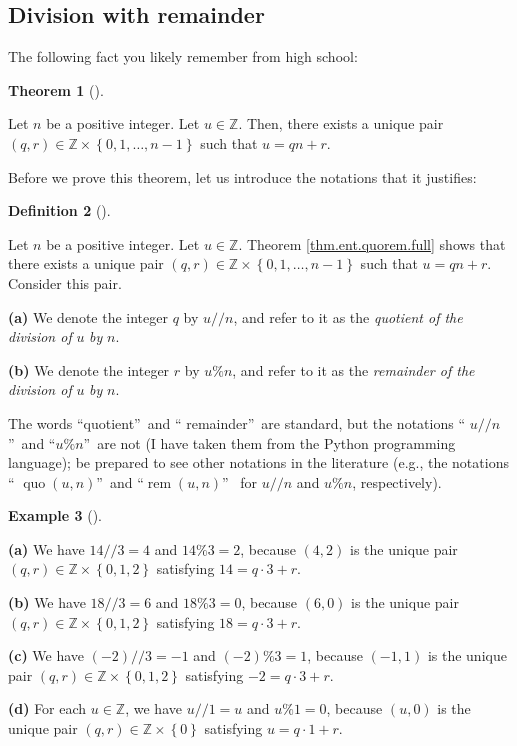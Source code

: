 \documentclass[numbers=enddot,12pt,final,onecolumn,notitlepage]{scrartcl}%
\numberwithin{exer}{subsection}
\theoremstyle{definition}
\newtheorem{theo}{Theorem}[subsection]
\newenvironment{theorem}[1][]
{\begin{theo}[#1]\begin{leftbar}}
{\end{leftbar}\end{theo}}
\newtheorem{defi}[theo]{Definition}
\newenvironment{definition}[1][]
{\begin{defi}[#1]\begin{leftbar}}
{\end{leftbar}\end{defi}}
\newtheorem{exam}[theo]{Example}
\newenvironment{example}[1][]
{\begin{exam}[#1]\begin{leftbar}}
{\end{leftbar}\end{exam}}
\begin{document}
\subsection{\label{sect.ent.quorem}Division with remainder}

The following fact you likely remember from high school:

\begin{theorem}
\label{thm.ent.quorem.full}Let $n$ be a positive integer. Let $u\in\mathbb{Z}%
$. Then, there exists a unique pair $\left(  q,r\right)  \in\mathbb{Z}%
\times\left\{  0,1,\ldots,n-1\right\}  $ such that $u=qn+r$.
\end{theorem}

Before we prove this theorem, let us introduce the notations that it justifies:

\begin{definition}
\label{def.ent.quorem}Let $n$ be a positive integer. Let $u\in\mathbb{Z}$.
Theorem \ref{thm.ent.quorem.full} shows that there exists a unique pair
$\left(  q,r\right)  \in\mathbb{Z}\times\left\{  0,1,\ldots,n-1\right\}  $
such that $u=qn+r$. Consider this pair.

\textbf{(a)} We denote the integer $q$ by $u//n$, and refer to it as the
\textit{quotient of the division of }$u$ \textit{by }$n$.

\textbf{(b)} We denote the integer $r$ by $u\%n$, and refer to it as the
\textit{remainder of the division of }$u$ \textit{by }$n$.
\end{definition}

The words \textquotedblleft quotient\textquotedblright\ and \textquotedblleft
remainder\textquotedblright\ are standard, but the notations \textquotedblleft%
$u//n$\textquotedblright\ and \textquotedblleft$u\%n$\textquotedblright\ are
not (I have taken them from the Python programming language); be prepared to
see other notations in the literature (e.g., the notations \textquotedblleft%
$\operatorname*{quo}\left(  u,n\right)  $\textquotedblright\ and
\textquotedblleft$\operatorname*{rem}\left(  u,n\right)  $\textquotedblright%
\ for $u//n$ and $u\%n$, respectively).

\begin{example}
\textbf{(a)} We have $14//3=4$ and $14\%3=2$, because $\left(  4,2\right)  $
is the unique pair $\left(  q,r\right)  \in\mathbb{Z}\times\left\{
0,1,2\right\}  $ satisfying $14=q\cdot3+r$.

\textbf{(b)} We have $18//3=6$ and $18\%3=0$, because $\left(  6,0\right)  $
is the unique pair $\left(  q,r\right)  \in\mathbb{Z}\times\left\{
0,1,2\right\}  $ satisfying $18=q\cdot3+r$.

\textbf{(c)} We have $\left(  -2\right)  //3=-1$ and $\left(  -2\right)
\%3=1$, because $\left(  -1,1\right)  $ is the unique pair $\left(
q,r\right)  \in\mathbb{Z}\times\left\{  0,1,2\right\}  $ satisfying
$-2=q\cdot3+r$.

\textbf{(d)} For each $u\in\mathbb{Z}$, we have $u//1=u$ and $u\%1=0$, because
$\left(  u,0\right)  $ is the unique pair $\left(  q,r\right)  \in
\mathbb{Z}\times\left\{  0\right\}  $ satisfying $u=q\cdot1+r$.
\end{example}
\end{document}
